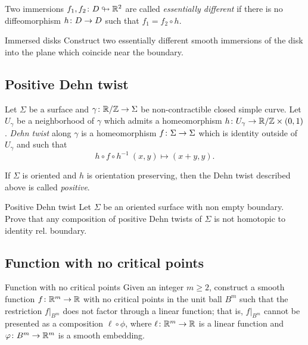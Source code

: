 Two immersions $f_1,f_2\colon D\looparrowright \mathbb{R}^2$ are called \emph{essentially different} 
if there is no diffeomorphism $h\:D\z\to D$ such that
$f_1=f_2\circ h$.

\begin{pr}{}{Immersed disks}\label{Immersed disks} 
Construct two essentially different smooth immersions of the disk 
into the plane which coincide near the boundary. 
\end{pr}

\subsection*{Positive Dehn twist}


Let $\Sigma$ be a surface and $\gamma\colon\mathbb{R}/\mathbb{Z}\to\Sigma$ be non-contractible closed simple curve.
Let $U_\gamma$ be a neighborhood of $\gamma$ which admits a homeomorphism $h\colon U_\gamma\to \mathbb{R}/\mathbb{Z}\times (0,1)$.
\emph{Dehn twist} along $\gamma$ is a homeomorphism $f\:\Sigma\z\to\Sigma$
which is identity outside of $U_\gamma$ and 
such that
$$h\circ f\circ h^{-1}\:(x,y)\mapsto(x+y,y).$$

If $\Sigma$ is oriented 
and $h$ is orientation preserving,
then the Dehn twist described above is called \emph{positive}.

\begin{pr}{\easy}{Positive Dehn twist}\label{Positive Dehn twist} Let $\Sigma$ be an oriented surface with non empty boundary.
Prove that any composition of positive Dehn twists of $\Sigma$ is not homotopic to identity rel. boundary.
\end{pr}

\subsection*{Function with no critical points}

\begin{pr}{}{Function with no critical points}\label{Function with no critical points}
Given an integer $m\ge 2$, 
construct a smooth function $f\colon\mathbb{R}^m\to \mathbb{R}$ 
with no critical points in the unit ball $B^m$ 
such that the restriction $f|_{B^m}$ does not factor through a linear function;
that is, 
$f|_{B^m}$ cannot be presented as a composition
$\ell\circ\phi$,
where $\ell\colon\mathbb{R}^m\to\mathbb{R}$ is a linear function 
and $\varphi\colon B^m\to\mathbb{R}^m$ is a smooth embedding.
\end{pr}

